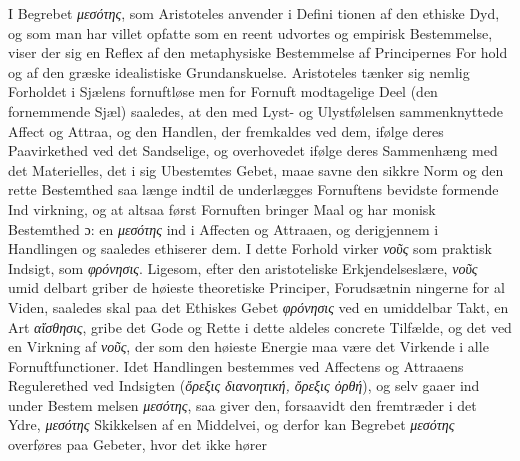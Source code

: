 \documentclass[12pt,a4paper]{book}
\newcommand{\gk}[1]{\textit{#1}}
\begin{document}
I Begrebet \gk{μεσότης}, som Aristoteles anvender i Defini\-%
tionen af den ethiske Dyd, og som man har villet opfatte som
en reent udvortes og empirisk Bestemmelse, viser der sig en
Reflex af den metaphysiske Bestemmelse af Principernes For\-%
hold og af den græske idealistiske Grundanskuelse. Aristoteles
tænker sig nemlig Forholdet i Sjælens fornuftløse men for
Fornuft modtagelige Deel (den fornemmende Sjæl) saaledes, at
den med Lyst- og Ulystfølelsen sammenknyttede Affect og
Attraa, og den Handlen, der fremkaldes ved dem, ifølge deres
Paavirkethed ved det Sandselige, og overhovedet ifølge deres
Sammenhæng med det Materielles, det i sig Ubestemtes Gebet,
maae savne den sikkre Norm og den rette Bestemthed saa\-%
længe indtil de underlægges Fornuftens bevidste formende Ind\-%
virkning, og at altsaa først Fornuften bringer Maal og har\-%
monisk Bestemthed ɔ: en \gk{μεσότης} ind i Affecten og Attraaen,
og derigjennem i Handlingen og saaledes ethiserer dem. I
dette Forhold virker \gk{νοῦς} som praktisk Indsigt, som \gk{φρόνησις}.
Ligesom, efter den aristoteliske Erkjendelseslære, \gk{νοῦς} umid\-%
delbart griber de høieste theoretiske Principer, Forudsætnin\-%
ningerne for al Viden, saaledes skal paa det Ethiskes Gebet
\gk{φρόνησις} ved en umiddelbar Takt, en Art \gk{αἴσθησις}, gribe det
Gode og Rette i dette aldeles concrete Tilfælde, og det ved en
Virkning af \gk{νοῦς}, der som den høieste Energie maa være det
Virkende i alle Fornuftfunctioner. Idet Handlingen bestemmes
ved Affectens og Attraaens Regulerethed ved Indsigten (\gk{ὄρεξις
διανοητική, ὄρεξις ὀρθή}), og selv gaaer ind under Bestem\-%
melsen \gk{μεσότης}, saa giver den, forsaavidt den fremtræder i
det Ydre, \gk{μεσότης} Skikkelsen af en Middelvei, og derfor kan
Begrebet \gk{μεσότης} overføres paa Gebeter, hvor det ikke hører
\end{document}

